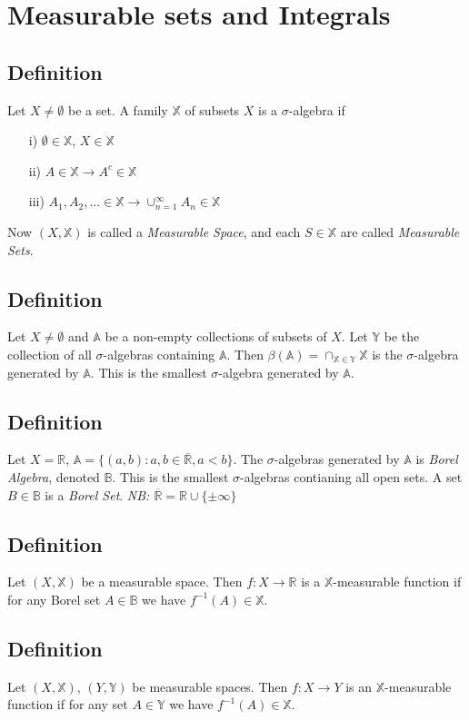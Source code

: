 \documentclass[a4paper, 12pt, twoside]{article}
\begin{document}
\newpage
\section{Measurable sets and Integrals}
\subsection{Definition}
Let $X\neq\emptyset$ be a set. A family  $\mathbb{X}$ of subsets $X$ is a $\sigma$-algebra if
\begin{itemize}
    \item[i)] $\emptyset \in  \mathbb{X}$, $X \in \mathbb{X}$
    \item[ii)] $A\in \mathbb{X} \rightarrow A^{c} \in \mathbb{X}$
    \item[iii)] $A_{1},A_{2},\dots \in \mathbb{X} \rightarrow \cup_{n=1}^{\infty}A_{n}\in \mathbb{X}$
\end{itemize}
Now $(X,\mathbb{X})$ is called a \emph{Measurable Space}, and each $S\in\mathbb{X}$ are called \emph{Measurable Sets}.
\subsection{Definition}
Let $X\neq\emptyset$ and $\mathbb{A}$ be a non-empty collections of subsets of $X$. Let $\mathbb{Y}$ be the collection of all $\sigma$-algebras containing $\mathbb{A}$. Then $\beta(\mathbb{A})=\cap_{\mathbb{X}\in\mathbb{Y}}\mathbb{X}$ is the $\sigma$-algebra generated by $\mathbb{A}$. This is the smallest $\sigma$-algebra generated by $\mathbb{A}$.
\subsection{Definition}
Let $X=\mathbb{R}$, $\mathbb{A}=\{(a,b):a,b\in\overline{\mathbb{R}},a<b\}$. The $\sigma$-algebras generated by $\mathbb{A}$ is \emph{Borel Algebra}, denoted $\mathbb{B}$. This is the smallest $\sigma$-algebras contianing all open sets. A set $B\in \mathbb{B}$ is a \emph{Borel Set}.
\textit{NB: $\overline{\mathbb{R}}=\mathbb{R}\cup \{\pm\infty\}$}
\subsection{Definition}
Let $(X,\mathbb{X})$ be a measurable space. Then $f:X \to  \mathbb{R}$ is a $\mathbb{X}$-measurable function if for any Borel set $A\in \mathbb{B}$ we have $f^{-1}(A)\in \mathbb{X}$.
\subsection{Definition}
Let $(X,\mathbb{X})$, $(Y,\mathbb{Y})$ be measurable spaces. Then $f:X \to  Y$ is an $\mathbb{X}$-measurable function if for any set $A\in \mathbb{Y}$ we have $f^{-1}(A)\in \mathbb{X}$.
\newpage
\end{document}
